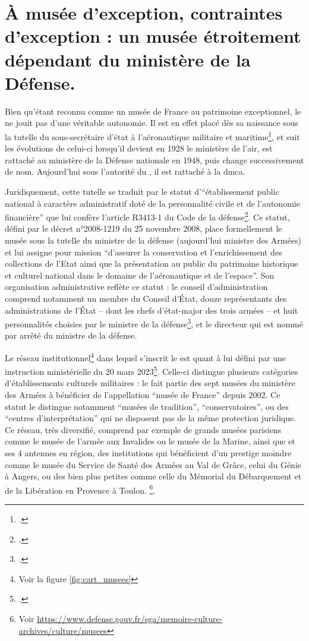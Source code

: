 \section{\label{I-B-1}À musée d'exception, contraintes d'exception : un musée étroitement dépendant du ministère de la Défense. }

Bien qu'étant reconnu comme un musée de France au patrimoine exceptionnel, le \mae ne jouit pas d'une véritable autonomie. Il est en effet placé dès sa naissance sous la tutelle du sous-secrétaire d'état à l'aéronautique militaire et maritime\footcite{terrierAeroportParisBourget2019}, et suit les évolutions de celui-ci lorsqu'il devient en 1928 le ministère de l'air, est rattaché au ministère de la Défense nationale en 1948, puis change successivement de nom. Aujourd'hui sous l'autorité du \minarm, il est rattaché à la \gls{dmca}.

Juridiquement, cette tutelle se traduit par le statut d'\enquote{établissement public national à caractère administratif doté de la personnalité civile et de l'autonomie financière} que lui confère l'article R3413-1 du Code de la défense\footcite{ArticleR34131Code2008}. Ce statut, défini par le décret n°2008-1219 du 25 novembre 2008, place formellement le musée sous la tutelle du ministre de la défense (aujourd'hui ministre des Armées) et lui assigne pour mission  \enquote{d'assurer la conservation et l'enrichissement des collections de l'Etat ainsi que la présentation au public du patrimoine historique et culturel national dans le domaine de l'aéronautique et de l'espace}. Son organisation administrative reflète ce statut : le conseil d'administration comprend notamment un membre du Conseil d'État, douze représentants des administrations de l'État -- dont les chefs d'état-major des trois armées -- et huit personnalités choisies par le ministre de la défense\footcite{ArticleR341373Code2013}, et le directeur qui est nommé par arrêté du ministre de la défense.

Le réseau institutionnel\footnote{Voir la figure \ref{fig:cart_musees}} dans lequel s'inscrit le \mae est quant à lui défini  par une instruction ministérielle du 20 mars 2023\footcite{ministeredesarmeesInstructionNdeg303ARM2023}. 
Celle-ci distingue plusieurs catégories d'établissements culturels militaires : le \mae fait partie des sept musées du ministère des Armées à bénéficier de l'appellation \enquote{musée de France} depuis 2002. Ce statut le distingue notamment \enquote{musées de tradition}, \enquote{conservatoires}, ou des \enquote{centres d'interprétation} qui ne disposent pas de la même protection juridique. Ce réseau, très diversifié, comprend par exemple de grands musées parisiens comme le musée de l'armée aux Invalides ou le musée de la Marine, ainsi que et ses 4 antennes en région, des institutions qui bénéficient d'un prestige moindre comme le musée du Service de Santé des Armées au Val de Grâce, celui du Génie à Angers, ou des bien plus petites comme celle du Mémorial du Débarquement et de la Libération en Provence à Toulon.
\footnote{Voir \url{https://www.defense.gouv.fr/sga/memoire-culture-archives/culture/musees}}.


